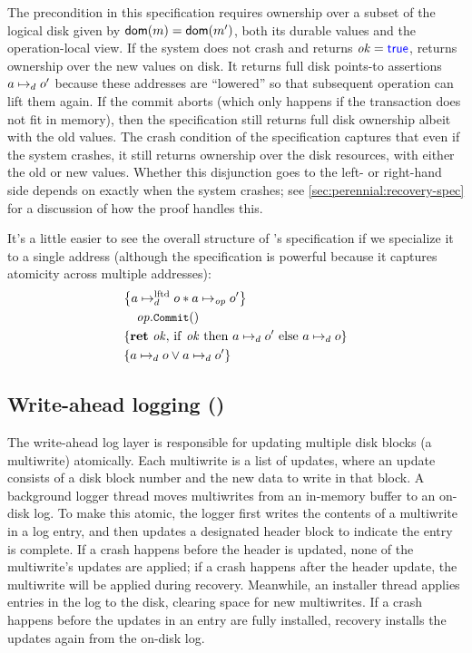 The precondition in this specification requires ownership over a subset of the
logical disk given by $\textsf{\upshape dom}(m) = \textsf{\upshape dom}(m')$, both its durable values and the
operation-local view. If the system does not crash and returns
$\mathit{ok} = \mathsf{\textcolor{blue}{true}}$,  returns ownership over the new values
on disk. It returns full disk points-to assertions $a \mapsto_d o'$ because
these addresses are ``lowered'' so that subsequent operation can lift them
again. If the commit aborts (which only happens if the transaction does not fit
in memory), then the specification still returns full disk ownership albeit with
the old values. The crash condition of the  specification captures
that even if the system crashes, it still returns ownership over the disk
resources, with either the old or new values. Whether this disjunction goes to
the left- or right-hand side depends on exactly when the system crashes; see
\cref{sec:perennial:recovery-spec} for a discussion of how the proof handles
this.

It's a little easier to see the overall structure of 's specification
if we specialize it to a single address (although the specification is powerful
because it captures atomicity across multiple addresses):
\begin{align*}
  \hoareCV{a \mapstoLftd o \sep a \mapstoOp o'} %
  {\mathit{op}.\cc{Commit}()}%
  {\Ret{\mathit{ok}} \mathrm{if~} \mathit{ok} %
  \mathrm{~then~} a \mapstoDisk o' \mathrm{~else~} a \mapstoDisk o}%
  {a \mapstoDisk o \lor a \mapstoDisk o'}
\end{align*}

\subsection{Write-ahead logging ()}

The write-ahead log layer is responsible for updating multiple disk
blocks (a multiwrite) atomically.
Each multiwrite is a list
of updates, where an update consists of a disk block number and the new data to write in that block.
A background logger thread moves multiwrites from an in-memory buffer to an
on-disk log. To make this atomic, the logger first writes
the contents of a multiwrite in a log entry, and then updates a designated header block to indicate
the entry is complete. If a crash
happens before the header is updated, none of the multiwrite's updates
are applied; if a crash happens after the header update, the multiwrite
will be applied during recovery.
Meanwhile, an installer thread applies entries in the log to the disk, clearing
space for new multiwrites.
If a crash happens before the updates in an entry are fully installed,
recovery installs the updates again from the on-disk log.

